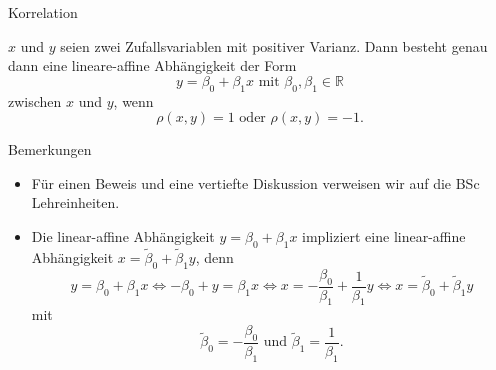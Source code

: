 \documentclass[
  8pt,
  ignorenonframetext,
]{beamer}
\providecommand{\tightlist}{%
  \setlength{\itemsep}{0pt}\setlength{\parskip}{0pt}}
\begin{document}
\begin{frame}{Korrelation}
\protect\hypertarget{korrelation-8}{}
\small
\begin{theorem}
\justifying
\normalfont
$x$ und $y$ seien zwei Zufallsvariablen mit positiver Varianz. Dann besteht genau
dann eine lineare-affine Abhängigkeit der Form
\begin{equation}
y = \beta_0 + \beta_1x \mbox{ mit } \beta_0,\beta_1\in \mathbb{R}
\end{equation}
zwischen $x$ und $y$, wenn
\begin{equation}
\rho(x,y) = 1 \mbox{ oder } \rho(x,y) = -1.
\end{equation}
\end{theorem}

\footnotesize

Bemerkungen

\begin{itemize}
\tightlist
\item
  Für einen Beweis und eine vertiefte Diskussion verweisen wir auf die
  BSc Lehreinheiten.
\item
  Die linear-affine Abhängigkeit \(y = \beta_0 + \beta_1x\) impliziert
  eine linear-affine Abhängigkeit
  \(x = \tilde{\beta}_0 + \tilde{\beta}_1y\), denn \begin{equation}
  y = \beta_0 + \beta_1x
  \Leftrightarrow
  -\beta_0 + y = \beta_1x
  \Leftrightarrow
  x = -\frac{\beta_0}{\beta_1} + \frac{1}{\beta_1}y
  \Leftrightarrow
  x = \tilde{\beta}_0 + \tilde{\beta}_1 y
  \end{equation} mit \begin{equation}
  \tilde{\beta}_0 = -\frac{\beta_0}{\beta_1} \mbox{ und } \tilde{\beta}_1 = \frac{1}{\beta_1}.
  \end{equation}
\end{itemize}
\end{frame}
\end{document}

